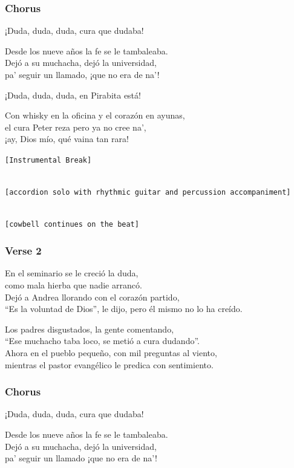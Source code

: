 \subsubsection{Chorus}\label{chorus-33}

¡Duda, duda, duda, cura que dudaba!

Desde los nueve años la fe se le tambaleaba.\\
Dejó a su muchacha, dejó la universidad,\\
pa' seguir un llamado, ¡que no era de na'!

¡Duda, duda, duda, en Pirabita está!

Con whisky en la oficina y el corazón en ayunas,\\
el cura Peter reza pero ya no cree na',\\
¡ay, Dios mío, qué vaina tan rara!

\texttt{{[}Instrumental\ Break{]}}\strut \\
\texttt{{[}accordion\ solo\ with\ rhythmic\ guitar\ and\ percussion\ accompaniment{]}}\strut \\
\texttt{{[}cowbell\ continues\ on\ the\ beat{]}}

\subsubsection{Verse 2}\label{verse-2-14}

En el seminario se le creció la duda,\\
como mala hierba que nadie arrancó.\\
Dejó a Andrea llorando con el corazón partido,\\
``Es la voluntad de Dios'', le dijo, pero él mismo no lo ha creído.

Los padres disgustados, la gente comentando,\\
``Ese muchacho taba loco, se metió a cura dudando''.\\
Ahora en el pueblo pequeño, con mil preguntas al viento,\\
mientras el pastor evangélico le predica con sentimiento.

\subsubsection{Chorus}\label{chorus-34}

¡Duda, duda, duda, cura que dudaba!

Desde los nueve años la fe se le tambaleaba.\\
Dejó a su muchacha, dejó la universidad,\\
pa' seguir un llamado ¡que no era de na'!

